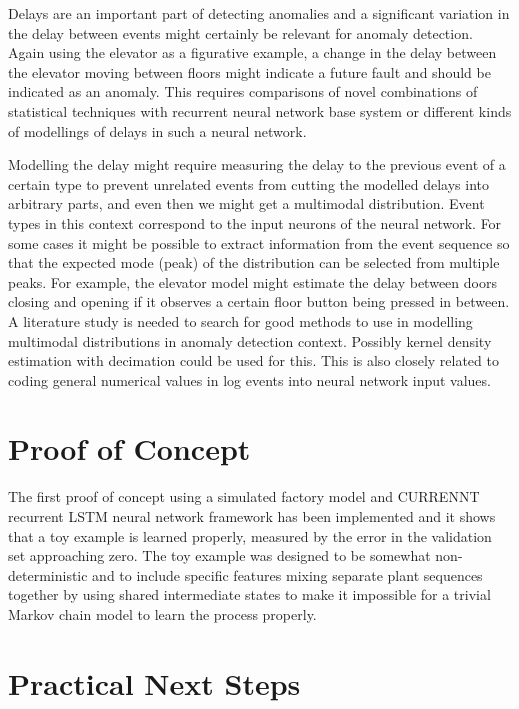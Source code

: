 \documentclass[a4paper,10pt]{article}
\begin{document}
Delays are an important part of detecting anomalies and a significant variation in the delay between events might certainly be relevant for anomaly detection.
Again using the elevator as a figurative example, a change in the delay between the elevator moving between floors might indicate a future fault and should be indicated
as an anomaly. This requires comparisons of novel combinations of statistical techniques with recurrent neural network base system or different kinds of
modellings of delays in such a neural network.

Modelling the delay might require measuring the delay to the previous event of a certain type to prevent unrelated events from cutting the modelled delays into arbitrary parts,
and even then we might get a multimodal distribution. Event types in this context correspond to the input neurons of the neural network.
For some cases it might be possible to extract information from the event sequence so that
the expected mode (peak) of the distribution can be selected from multiple peaks. For example,
the elevator model might estimate the delay between doors closing and opening if it observes a certain floor button being pressed in between.
A literature study is needed to search for good methods to use in modelling multimodal distributions in anomaly detection context. Possibly kernel density estimation
with decimation could be used for this. This is also closely related to coding general numerical values in log events into neural network input values.

\section{Proof of Concept}

The first proof of concept using a simulated factory model and CURRENNT\cite{CURRENNT} recurrent LSTM neural network framework
has been implemented and it shows that
a toy example\cite{PoC}
is learned properly, measured by the error in the validation set approaching zero. The toy example was designed to be somewhat non-deterministic and to include specific
features mixing separate plant sequences together by using shared intermediate states to make it impossible for a trivial Markov chain model to learn the process properly.

\section{Practical Next Steps}
\end{document}
